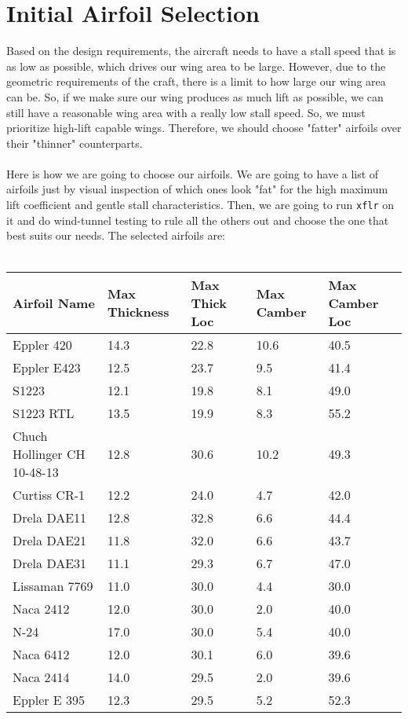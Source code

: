 \section{Initial Airfoil Selection}
\begin{comment}
\end{comment}
Based on the design requirements, the aircraft needs to have a stall speed that is as low as possible, which drives our wing area to be large.
However, due to the geometric requirements of the craft, there is a limit to how large our wing area can be.
So, if we make sure our wing produces as much lift as possible, we can still have a reasonable wing area with a really low stall speed. 
So, we must prioritize high-lift capable wings.
Therefore, we should choose "fatter" airfoils over their "thinner" counterparts.
\\~\\Here is how we are going to choose our airfoils. 
We are going to have a list of airfoils just by visual inspection of which ones look "fat" for the high maximum lift coefficient and gentle stall characteristics.
Then, we are going to run \texttt{xflr} on it and do wind-tunnel testing to rule all the others out and choose the one that best suits our needs.
The selected airfoils are:
\\~\\\begin{tabular}{|m{\ltabsize}|m{\tabsize}|m{\tabsize}|m{\tabsize}|m{\tabsize}|}
\hline 
Airfoil Name  & Max Thickness & Max Thick Loc & Max Camber & Max Camber Loc \\ \hline
Eppler 420      & 14.3 & 22.8 & 10.6 & 40.5 \\ \hline
Eppler E423     & 12.5 & 23.7 &  9.5 & 41.4 \\ \hline
S1223           & 12.1 & 19.8 &  8.1 & 49.0 \\ \hline
S1223 RTL       & 13.5 & 19.9 &  8.3 & 55.2 \\ \hline
Chuch Hollinger CH 10-48-13 & 12.8 & 30.6 & 10.2 & 49.3 \\ \hline
Curtiss CR-1    & 12.2 & 24.0 &  4.7 & 42.0 \\ \hline
Drela DAE11     & 12.8 & 32.8 &  6.6 & 44.4 \\ \hline
Drela DAE21     & 11.8 & 32.0 &  6.6 & 43.7 \\ \hline
Drela DAE31     & 11.1 & 29.3 &  6.7 & 47.0 \\ \hline
Lissaman 7769   & 11.0 & 30.0 &  4.4 & 30.0 \\ \hline
Naca 2412       & 12.0 & 30.0 &  2.0 & 40.0  \\ \hline
N-24            & 17.0 & 30.0 &  5.4 & 40.0 \\ \hline
Naca 6412       & 12.0 & 30.1 &  6.0 & 39.6 \\ \hline
Naca 2414       & 14.0 & 29.5 &  2.0 & 39.6 \\ \hline
Eppler E 395    & 12.3 & 29.5 &  5.2 & 52.3 \\ \hline
\end{tabular}
